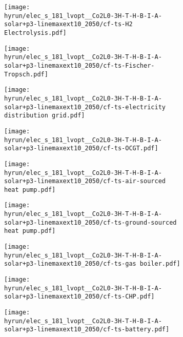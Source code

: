 \begin{figure}
    \begin{subfigure}{0.49\textwidth}
        \centering
        \texttt{[image: \\hyrun/elec\_s\_181\_lvopt\_\_Co2L0-3H-T-H-B-I-A-solar+p3-linemaxext10\_2050/cf-ts-H2 Electrolysis.pdf]}
    \end{subfigure}
    \begin{subfigure}{0.49\textwidth}
        \centering
        \texttt{[image: \\hyrun/elec\_s\_181\_lvopt\_\_Co2L0-3H-T-H-B-I-A-solar+p3-linemaxext10\_2050/cf-ts-Fischer-Tropsch.pdf]}
    \end{subfigure}
    \begin{subfigure}{0.49\textwidth}
        \centering
        \texttt{[image: \\hyrun/elec\_s\_181\_lvopt\_\_Co2L0-3H-T-H-B-I-A-solar+p3-linemaxext10\_2050/cf-ts-electricity distribution grid.pdf]}
    \end{subfigure}
    \begin{subfigure}{0.49\textwidth}
        \centering
        \texttt{[image: \\hyrun/elec\_s\_181\_lvopt\_\_Co2L0-3H-T-H-B-I-A-solar+p3-linemaxext10\_2050/cf-ts-OCGT.pdf]}
    \end{subfigure}
    \begin{subfigure}{0.49\textwidth}
        \centering
        \texttt{[image: \\hyrun/elec\_s\_181\_lvopt\_\_Co2L0-3H-T-H-B-I-A-solar+p3-linemaxext10\_2050/cf-ts-air-sourced heat pump.pdf]}
    \end{subfigure}
    \begin{subfigure}{0.49\textwidth}
        \centering
        \texttt{[image: \\hyrun/elec\_s\_181\_lvopt\_\_Co2L0-3H-T-H-B-I-A-solar+p3-linemaxext10\_2050/cf-ts-ground-sourced heat pump.pdf]}
    \end{subfigure}
    \begin{subfigure}{0.49\textwidth}
        \centering
        \texttt{[image: \\hyrun/elec\_s\_181\_lvopt\_\_Co2L0-3H-T-H-B-I-A-solar+p3-linemaxext10\_2050/cf-ts-gas boiler.pdf]}
    \end{subfigure}
    \begin{subfigure}{0.49\textwidth}
        \centering
        \texttt{[image: \\hyrun/elec\_s\_181\_lvopt\_\_Co2L0-3H-T-H-B-I-A-solar+p3-linemaxext10\_2050/cf-ts-CHP.pdf]}
    \end{subfigure}
    \begin{subfigure}{0.49\textwidth}
        \centering
        \texttt{[image: \\hyrun/elec\_s\_181\_lvopt\_\_Co2L0-3H-T-H-B-I-A-solar+p3-linemaxext10\_2050/cf-ts-battery.pdf]}

\end{subfigure}
\end{figure}

